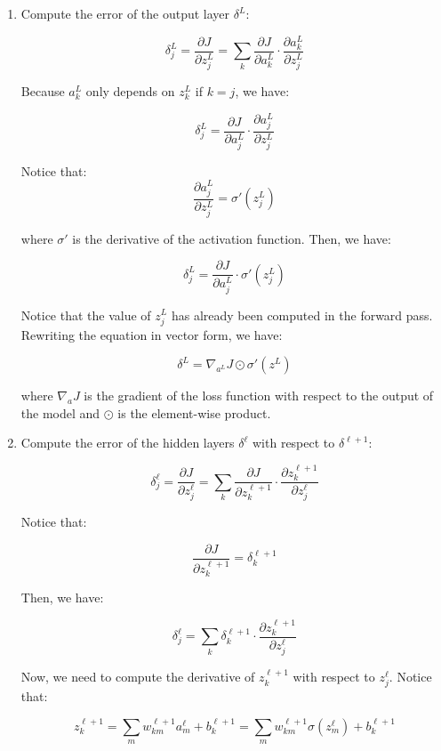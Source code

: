 \begin{enumerate}
    \item Compute the error of the output layer $\delta^L$:
    
    $$\delta^L_j = \frac{\partial J}{\partial z^L_j} = \sum_{k} \frac{\partial J}{\partial a^L_k} \cdot \frac{\partial a^L_k}{\partial z^L_j} $$
    
    Because $a^L_k$ only depends on $z^L_k$ if $k = j$, we have:

    $$\delta^L_j = \frac{\partial J}{\partial a^L_j} \cdot \frac{\partial a^L_j}{\partial z^L_j}$$
    
    Notice that:
    $$\frac{\partial a^L_j}{\partial z^L_j} = \sigma'(z^L_j)$$ 
     
    where $\sigma'$ is the derivative of the activation function. Then, we have:

    $$\delta^L_j = \frac{\partial J}{\partial a^L_j} \cdot \sigma'(z^L_j)$$

    Notice that the value of $z^L_j$ has already been computed in the forward pass.
    Rewriting the equation in vector form, we have:

    \begin{equation}
        \delta^L = \nabla_{a^L} J \odot \sigma'(z^L)
    \end{equation}

    where $\nabla_a J$ is the gradient of the loss function with respect to the output
    of the model and $\odot$ is the element-wise product.

    \item Compute the error of the hidden layers $\delta^\ell$ with respect to $\delta^{\ell+1}$:
    
    $$\delta^\ell_j = \frac{\partial J}{\partial z^\ell_j} = \sum_{k} \frac{\partial J}{\partial z^{\ell+1}_k} \cdot \frac{\partial z^{\ell+1}_k}{\partial z^\ell_j}$$

    Notice that: 
    
    $$\frac{\partial J}{\partial z^{\ell+1}_k} = \delta^{\ell+1}_k$$

    Then, we have:

    $$\delta^\ell_j = \sum_{k} \delta^{\ell+1}_k \cdot \frac{\partial z^{\ell+1}_k}{\partial z^\ell_j}$$

    Now, we need to compute the derivative of $z^{\ell+1}_k$ with respect to $z^\ell_j$.
    Notice that:

    $$z^{\ell+1}_k = \sum_{m} w^{\ell+1}_{km} a^\ell_m + b^{\ell+1}_k  = \sum_{m} w^{\ell+1}_{km} \sigma(z^\ell_m) + b^{\ell+1}_k$$


\end{enumerate}
